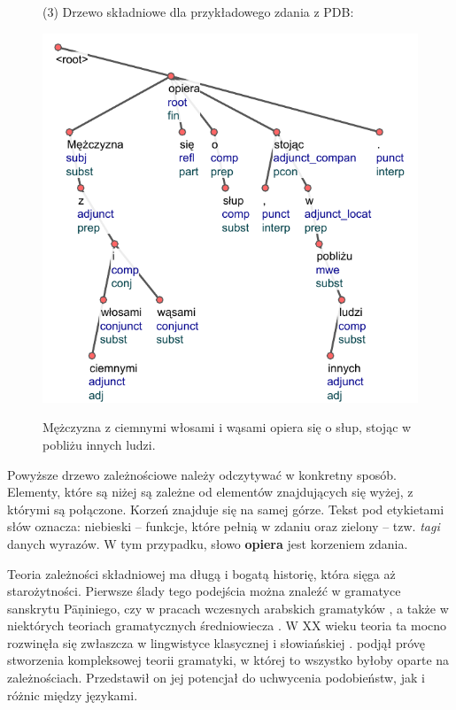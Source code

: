 \documentclass[licencjacka]{pracamgr_Kogni}
\begin{document}
\begin{figure}
    \hspace{0.7cm}(3) Drzewo składniowe dla przykładowego zdania z PDB:

    \includegraphics{drzewko.pdf}

    Mężczyzna z ciemnymi włosami i wąsami opiera się o słup, stojąc w pobliżu innych ludzi.
\end{figure}

Powyższe drzewo zależnościowe należy odczytywać w konkretny sposób. Elementy, które są niżej są zależne od elementów znajdujących się wyżej, z którymi są połączone. Korzeń znajduje się na samej górze. Tekst pod etykietami słów oznacza: niebieski -- funkcje, które pełnią w zdaniu oraz zielony -- tzw. \textit{tagi} danych wyrazów. W tym przypadku, słowo \textbf{opiera} jest korzeniem zdania.

Teoria zależności składniowej ma długą i bogatą historię, która sięga aż starożytności. Pierwsze ślady tego podejścia można znaleźć w gramatyce sanskrytu Pāṇiniego, czy w pracach wczesnych arabskich gramatyków \citep{Kruijff2002}, a także w niektórych teoriach gramatycznych średniowiecza \citep{Covington1984}. W XX wieku teoria ta mocno rozwinęła się zwłaszcza w lingwistyce klasycznej i słowiańskiej \citep{Melcuk1988}. \citet{Tesniere1959} podjął próvę stworzenia kompleksowej teorii gramatyki, w której to wszystko byłoby oparte na zależnościach. Przedstawił on jej potencjał do uchwycenia podobieństw, jak i różnic między językami.
\end{document}
